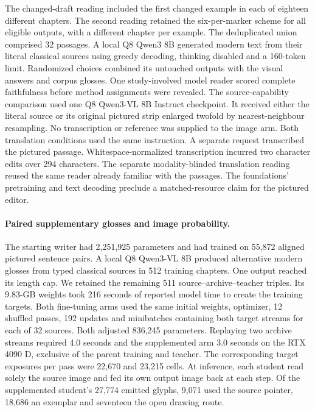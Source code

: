 \documentclass[12pt,a4paper]{article}
\providecommand{\DIFadd}[1]{{\protect\color{blue} \sf #1}} %
\begin{document}
\DIFadd{The changed-draft reading included the first changed example in each of eighteen different chapters. The second reading retained the six-per-marker scheme for all eligible outputs, with a different chapter per example. The deduplicated union comprised 32 passages. A local Q8 Qwen3 8B generated modern text from their literal classical sources using greedy decoding, thinking disabled and a 160-token limit. Randomized choices combined its untouched outputs with the visual answers and corpus glosses. One study-involved model reader scored complete faithfulness before method assignments were revealed. The source-capability comparison used one Q8 Qwen3-VL 8B Instruct checkpoint. It received either the literal source or its original pictured strip enlarged twofold by nearest-neighbour resampling. No transcription or reference was supplied to the image arm. Both translation conditions used the same instruction. A separate request transcribed the pictured passage. Whitespace-normalized transcription incurred two character edits over 294 characters. The separate modality-blinded translation reading reused the same reader already familiar with the passages. The foundations' pretraining and text decoding preclude a matched-resource claim for the pictured editor.
}

\paragraph{\DIFadd{Paired supplementary glosses and image probability.}}
\DIFadd{The starting writer had 2,251,925 parameters and had trained on 55,872 aligned pictured sentence pairs. A local Q8 Qwen3-VL 8B produced alternative modern glosses from typed classical sources in 512 training chapters. One output reached its length cap. We retained the remaining 511 source--archive--teacher triples. Its 9.83-GB weights took 216 seconds of reported model time to create the training targets. Both fine-tuning arms used the same initial weights, optimizer, 12 shuffled passes, 192 updates and minibatches containing both target streams for each of 32 sources. Both adjusted 836,245 parameters. Replaying two archive streams required 4.0 seconds and the supplemented arm 3.0 seconds on the RTX 4090 D, exclusive of the parent training and teacher. The corresponding target exposures per pass were 22,670 and 23,215 cells. At inference, each student read solely the source image and fed its own output image back at each step. Of the supplemented student's 27,774 emitted glyphs, 9,071 used the source pointer, 18,686 an exemplar and seventeen the open drawing route.
}
\end{document}
